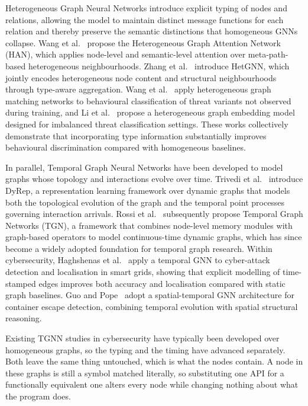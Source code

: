 \documentclass[%
    BCOR=10mm,
    DIV=13,
    toc=bibliography,
    toc=listof,
    oneside,
    12pt,
]{scrbook}
\begin{document}
Heterogeneous Graph Neural Networks introduce explicit typing of nodes and
relations, allowing the model to maintain distinct message functions for each
relation and thereby preserve the semantic distinctions that homogeneous GNNs
collapse. Wang et al.~\cite{han2019} propose the Heterogeneous Graph Attention
Network (HAN), which applies node-level and semantic-level attention over
meta-path-based heterogeneous neighbourhoods. Zhang et al.~\cite{hetgnn2019}
introduce HetGNN, which jointly encodes heterogeneous node content and
structural neighbourhoods through type-aware aggregation. Wang et
al.~\cite{wang2019matchgnet} apply heterogeneous graph matching networks to
behavioural classification of threat variants not observed during training,
and Li et al.~\cite{li2024imbalanced} propose a heterogeneous graph embedding
model designed for imbalanced threat classification settings. These works
collectively demonstrate that incorporating type information substantially
improves behavioural discrimination compared with homogeneous baselines.

In parallel, Temporal Graph Neural Networks have been developed to model graphs
whose topology and interactions evolve over time. Trivedi et
al.~\cite{dyrep2019} introduce DyRep, a representation learning framework over
dynamic graphs that models both the topological evolution of the graph and the
temporal point processes governing interaction arrivals. Rossi et
al.~\cite{tgn2020} subsequently propose Temporal Graph Networks (TGN), a
framework that combines node-level memory modules with graph-based operators
to model continuous-time dynamic graphs, which has since become a widely
adopted foundation for temporal graph research. Within cybersecurity,
Haghshenas et al.~\cite{haghshenas2023temporal} apply a temporal GNN to
cyber-attack detection and localisation in smart grids, showing that explicit
modelling of time-stamped edges improves both accuracy and localisation
compared with static graph baselines. Guo and Pope~\cite{guopope2023} adopt a
spatial-temporal GNN architecture for container escape detection, combining
temporal evolution with spatial structural reasoning.

Existing TGNN studies in cybersecurity have typically been developed over
homogeneous graphs, so the typing and the timing have advanced separately.
Both leave the same thing untouched, which is what the nodes contain. A node
in these graphs is still a symbol matched literally, so substituting one API
for a functionally equivalent one alters every node while changing nothing
about what the program does.
\end{document}
